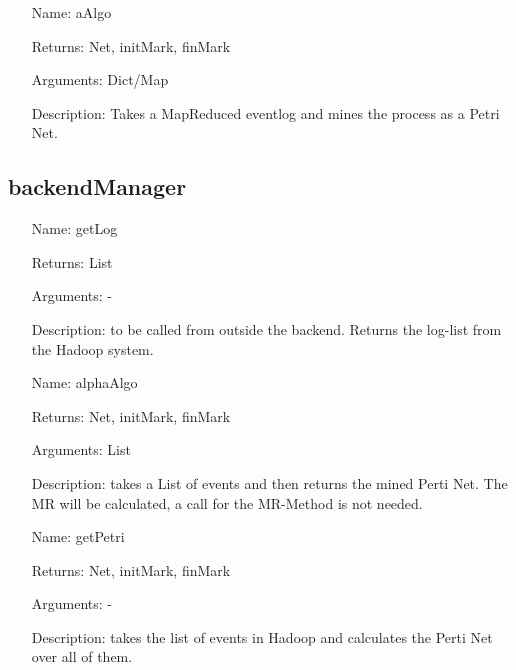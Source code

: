 \documentclass[runningheads]{llncs}
\begin{document}
\begin{itemize}
\item[Name:] aAlgo
\item[Returns:] Net, initMark, finMark
\item[Arguments:] Dict/Map
\item[Description:] Takes a MapReduced eventlog and mines the process as a Petri Net.
\end{itemize}

\subsection{backendManager}
\begin{itemize}
\item[Name:] getLog
\item[Returns:] List
\item[Arguments:] -
\item[Description:] to be called from outside the backend. Returns the log-list from the Hadoop system.
\end{itemize}
\begin{itemize}
\item[Name:] alphaAlgo
\item[Returns:] Net, initMark, finMark
\item[Arguments:] List
\item[Description:] takes a List of events and then returns the mined Perti Net. The MR will be calculated, a call for the MR-Method is not needed.
\end{itemize}

\begin{itemize}
\item[Name:] getPetri
\item[Returns:] Net, initMark, finMark
\item[Arguments:] -
\item[Description:] takes the list of events in Hadoop and calculates the Perti Net over all of them.
\end{itemize}



\end{document}
